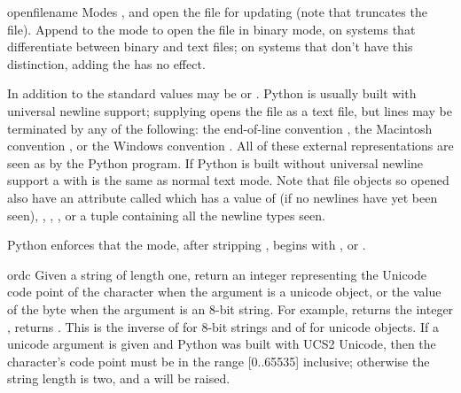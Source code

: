 \begin{funcdesc}{open}{filename}
  Modes ,  and  open the file for
  updating (note that  truncates the file).  Append
   to the mode to open the file in binary mode, on systems
  that differentiate between binary and text files; on systems
  that don't have this distinction, adding the  has no effect.
  
  In addition to the standard  values 
  may be  or .  Python is usually built with universal
  newline support; supplying  opens the file as a text file, but
  lines may be terminated by any of the following: the \UNIX{} end-of-line
  convention , 
  the Macintosh convention , or the Windows
  convention . All of these external representations are seen as
  by the Python program. If Python is built without universal newline support
  a  with  is the same as normal text mode.  Note that
  file objects so opened also have an attribute called
   which has a value of  (if no newlines
  have yet been seen), , , ,
  or a tuple containing all the newline types seen.

  Python enforces that the mode, after stripping , begins with
  ,  or .

\end{funcdesc}

\begin{funcdesc}{ord}{c}
  Given a string of length one, return an integer representing the
  Unicode code point of the character when the argument is a unicode object,
  or the value of the byte when the argument is an 8-bit string.
  For example,  returns the integer ,
   returns .  This is the inverse of
   for 8-bit strings and of  for unicode
  objects.  If a unicode argument is given and Python was built with
  UCS2 Unicode, then the character's code point must be in the range
  [0..65535] inclusive; otherwise the string length is two, and a
   will be raised.
\end{funcdesc}

